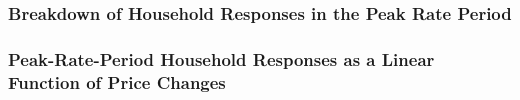 \subsubsection{Breakdown of Household Responses in the Peak Rate Period}
\label{Sub-subsection:Breakdown-of-Household-Responses-in-the-Peak-Rate-Period}



\subsubsection{Peak-Rate-Period Household Responses as a Linear Function of Price Changes}
\label{Sub-subsection:Peak-Rate-Period-Household-Responses-as-a-Linear-Function-of-Price-Changes}


